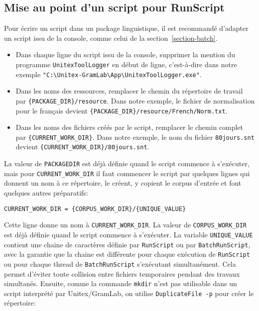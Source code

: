 \subsection{Mise au point d'un script pour RunScript}
\label{section-script-for-runscript}
Pour écrire un script dans un package linguistique, il est recommandé d'adapter un script issu
de la console, comme celui de la section~\ref{section-batch}.

\begin{itemize}     
\item Dans chaque ligne du script issu de la console, supprimer la mention du programme
\verb$UnitexToolLogger$ en début de ligne, c'est-à-dire dans notre exemple
\verb$"C:\Unitex-GramLab\App\UnitexToolLogger.exe"$.
\item Dans les noms des ressources, remplacer le chemin du répertoire de travail par
\verb${PACKAGE_DIR}/resource$. Dans notre exemple, le fichier de normalisation pour le français
devient \verb${PACKAGE_DIR}/resource/French/Norm.txt$.
\item Dans les noms des fichiers créés par le script, remplacer le chemin complet par
\verb${CURRENT_WORK_DIR}$. Dans notre exemple, le nom du fichier \verb$80jours.snt$ devient
\verb${CURRENT_WORK_DIR}/80jours.snt$.
\end{itemize}

\noindent La valeur de \verb$PACKAGEDIR$ est déjà définie quand le script commence à s'exécuter,
mais pour \verb$CURRENT_WORK_DIR$ il faut commencer le script par quelques lignes qui donnent un
nom à ce répertoire, le créent, y copient le corpus d'entrée et font quelques autres préparatifs:

\begin{Verbatim}[fontsize=\small,fontfamily=helvetica]
CURRENT_WORK_DIR = {CORPUS_WORK_DIR}/{UNIQUE_VALUE}
\end{Verbatim}

\noindent Cette ligne donne un nom à \verb$CURRENT_WORK_DIR$. La valeur de
\verb$CORPUS_WORK_DIR$ est déjà définie quand le script commence à s'exécuter. La variable
\verb$UNIQUE_VALUE$ contient une chaine de caractères définie par \verb$RunScript$ ou par
\verb$BatchRunScript$, avec la garantie que la chaine est différente pour chaque exécution de
\verb$RunScript$ ou pour chaque thread de \verb$BatchRunScript$ s’exécutant simultanément. Cela
permet d'éviter toute collision entre fichiers temporaires pendant des travaux simultanés. Ensuite,
comme la commande \verb$mkdir$ n’est pas utilisable dans un script interprété par Unitex/GramLab, on
utilise \verb$DuplicateFile -p$ pour créer le répertoire:

